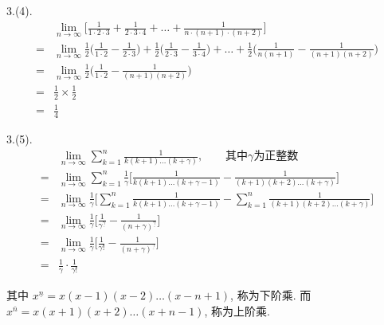 \begin{solve}
	3.(4).
	\begin{align*}
		&\lim_{n\rightarrow\infty}\Big[\frac{1}{1\cdot2\cdot3}+\frac{1}{2\cdot3\cdot4} +\dots +\frac{1}{n\cdot(n+1)\cdot(n+2)} \Big]\\
		=&\lim_{n\rightarrow\infty}\frac{1}{2}\Big(\frac{1}{1\cdot2}-\frac{1}{2\cdot3}\Big)+\frac{1}{2}\Big(\frac{1}{2\cdot3}-\frac{1}{3\cdot4}\Big)+\dots+\frac{1}{2}\Big(\frac{1}{n(n+1)}-\frac{1}{(n+1)(n+2)}\Big)\\
		=&\lim_{n\rightarrow\infty}\frac{1}{2}\Big(\frac{1}{1\cdot2}-\frac{1}{(n+1)(n+2)}\Big)\\
		=&\frac{1}{2}\times\frac{1}{2}\\
		=&\frac{1}{4}
	\end{align*}
\end{solve}
\begin{solve}
	3.(5).
	\begin{align*}
		&\lim_{n\rightarrow\infty}\sum_{k=1}^{n}\frac{1}{k(k+1)\dots(k+\gamma)},
		\qquad \text{其中}\gamma\text{为正整数}\\
		=&\lim_{n\rightarrow\infty} \sum_{k=1}^n \frac{1}{\gamma} \Big[\frac{1}{k(k+1)\dots(k+\gamma-1)}-\frac{1}{(k+1)(k+2)\dots(k+\gamma)}\Big]\\
		=&\lim_{n\rightarrow\infty}\frac{1}{\gamma}
		\Big[\sum_{k=1}^n \frac{1}{k(k+1)\dots(k+\gamma-1)}-\sum_{k=1}^n \frac{1}{(k+1)(k+2)\dots(k+\gamma)}\Big]\\
		=&\lim_{n\rightarrow\infty} \frac{1}{\gamma}\Big[\frac{1}{\gamma^{\underline{\gamma}}}-\frac{1}{(n+\gamma)^{\underline{\gamma}}}\Big]\\
		=&\lim_{n\rightarrow\infty} \frac{1}{\gamma}\Big[\frac{1}{\gamma!}-\frac{1}{(n+\gamma)^{\underline{\gamma}}}\Big]\\
		=&\frac{1}{\gamma}\cdot\frac{1}{\gamma!}		
	\end{align*}	
\end{solve}
其中 $ x^{\underline{n}} = x(x-1)(x-2)\dots(x-n+1) $, 称为下阶乘. 而$ x^{\overline{n}} = x(x+1)(x+2)\dots(x+n-1) $, 称为上阶乘. 

